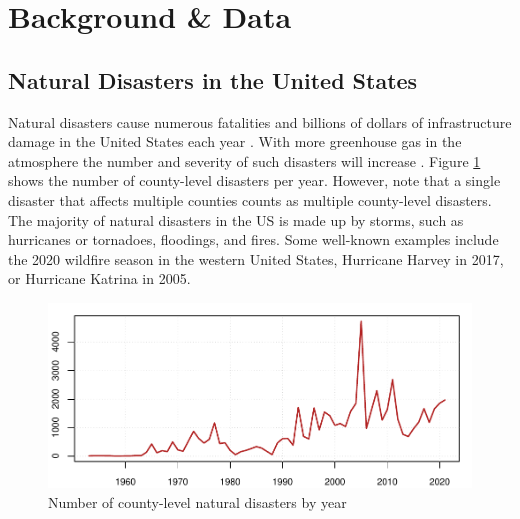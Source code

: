 
\section{Background \& Data} \label{Data}

\subsection{Natural Disasters in the United States}

Natural disasters cause numerous fatalities and billions of dollars of infrastructure damage in the United States each year \citep{Boustan_2020}. With more greenhouse gas in the atmosphere the number and severity of such disasters will increase \citep{IPCC_2021}. Figure \ref{DisasterCount} shows the number of county-level disasters per year. However, note that a single disaster that affects multiple counties counts as multiple county-level disasters. The majority of natural disasters in the US is made up by storms, such as hurricanes or tornadoes, floodings, and fires. Some well-known examples include the 2020 wildfire season in the western United States, Hurricane Harvey in 2017, or Hurricane Katrina in 2005.

\begin{figure}[!h]
	\centering
	\includegraphics[scale=1]{"../Code & Data/DisasterCount.pdf"}
	\caption{Number of county-level natural disasters by year}
	\label{DisasterCount}
\end{figure}

